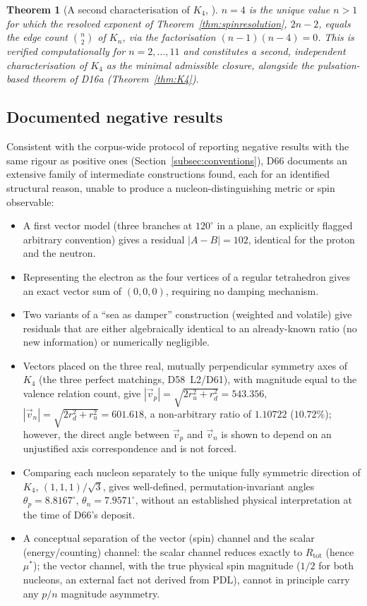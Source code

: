 \documentclass[11pt,a4paper]{article}
\theoremstyle{plain}
\newtheorem{theorem}{Theorem}[section]
\theoremstyle{definition}
\theoremstyle{remark}
\newcommand{\Rtot}{R_{\mathrm{tot}}}
\begin{document}
\begin{theorem}[A second characterisation of $K_4$, \cite{D66}]
\label{thm:n4unique}
$n=4$ is the unique value $n>1$ for which the resolved exponent of Theorem~\ref{thm:spinresolution}, $2n-2$, equals the edge count $\binom{n}{2}$ of $K_n$, via the factorisation $(n-1)(n-4)=0$. This is verified computationally for $n=2,\ldots,11$ and constitutes a second, independent characterisation of $K_4$ as the minimal admissible closure, alongside the pulsation-based theorem of D16a (Theorem~\ref{thm:K4}).
\end{theorem}

\subsection{Documented negative results}
\label{subsec:D66negative}

Consistent with the corpus-wide protocol of reporting negative results with the same rigour as positive ones (Section~\ref{subsec:conventions}), D66 documents an extensive family of intermediate constructions found, each for an identified structural reason, unable to produce a nucleon-distinguishing metric or spin observable:

\begin{itemize}
\item A first vector model (three branches at $120^\circ$ in a plane, an explicitly flagged arbitrary convention) gives a residual $|A-B|=102$, identical for the proton and the neutron.
\item Representing the electron as the four vertices of a regular tetrahedron gives an exact vector sum of $(0,0,0)$, requiring no damping mechanism.
\item Two variants of a ``sea as damper'' construction (weighted and volatile) give residuals that are either algebraically identical to an already-known ratio (no new information) or numerically negligible.
\item Vectors placed on the three real, mutually perpendicular symmetry axes of $K_4$ (the three perfect matchings, D58~L2/D61), with magnitude equal to the valence relation count, give $|\vec v_p|=\sqrt{2r_u^2+r_d^2}=543.356$, $|\vec v_n|=\sqrt{2r_d^2+r_u^2}=601.618$, a non-arbitrary ratio of $1.10722$ ($10.72\%$); however, the direct angle between $\vec v_p$ and $\vec v_n$ is shown to depend on an unjustified axis correspondence and is not forced.
\item Comparing each nucleon separately to the unique fully symmetric direction of $K_4$, $(1,1,1)/\sqrt3$, gives well-defined, permutation-invariant angles $\theta_p=8.8167^\circ$, $\theta_n=7.9571^\circ$, without an established physical interpretation at the time of D66's deposit.
\item A conceptual separation of the vector (spin) channel and the scalar (energy/counting) channel: the scalar channel reduces exactly to $\Rtot$ (hence $\mu^*$); the vector channel, with the true physical spin magnitude ($1/2$ for both nucleons, an external fact not derived from PDL), cannot in principle carry any $p/n$ magnitude asymmetry.
\end{itemize}
\end{document}
